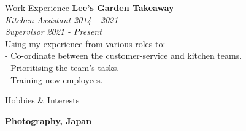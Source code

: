 \documentclass{resume} %
\begin{document}
\begin{rSection}{Work Experience}
{\bf Lee's Garden Takeaway } 
\\{\textit{Kitchen Assistant}} \hfill {\em 2014 - 2021} 
\\{\textit{Supervisor}} \hfill {\em 2021 - Present} 
\\Using my experience from various roles to: 
\\- Co-ordinate between the customer-service and kitchen teams.
\\- Prioritising the team's tasks.
\\- Training new employees.

\end{rSection}

\begin{rSection}{Hobbies \& Interests}

{\bf Photography, Japan }

\end{rSection}



\end{document}
